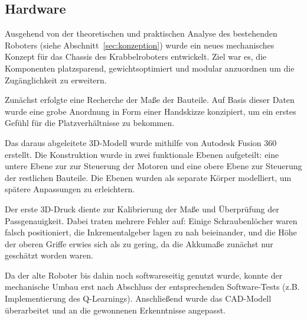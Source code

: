 \subsection{Hardware}

Ausgehend von der theoretischen und praktischen Analyse des bestehenden Roboters (siehe Abschnitt~\ref{sec:konzeption}) wurde ein neues mechanisches Konzept für das Chassis des Krabbelroboters 
entwickelt. Ziel war es, die Komponenten platzsparend, gewichtsoptimiert und modular anzuordnen um die Zugänglichkeit zu erweitern.

Zunächst erfolgte eine Recherche der Maße der Bauteile. Auf Basis dieser Daten wurde eine grobe Anordnung in Form einer Handskizze konzipiert, um ein erstes Gefühl für die Platzverhältnisse zu bekommen.

Das daraus abgeleitete 3D-Modell wurde mithilfe von Autodesk Fusion 360 erstellt. Die Konstruktion wurde in zwei funktionale Ebenen aufgeteilt: 
eine untere Ebene zur zur Steuerung der Motoren und eine obere Ebene zur Steuerung der restlichen Bauteile. 
Die Ebenen wurden als separate Körper modelliert, um spätere Anpassungen zu erleichtern.

Der erste 3D-Druck diente zur Kalibrierung der Maße und Überprüfung der Passgenauigkeit. Dabei traten mehrere Fehler auf: 
Einige Schraubenlöcher waren falsch positioniert, die Inkrementalgeber lagen zu nah beieinander, und die Höhe der oberen Griffe erwies sich als zu gering, 
da die Akkumaße zunächst nur geschätzt worden waren.

Da der alte Roboter bis dahin noch softwareseitig genutzt wurde, konnte der mechanische Umbau erst nach Abschluss der entsprechenden Software-Tests (z.B. Implementierung des Q-Learnings). 
Anschließend wurde das CAD-Modell überarbeitet und an die gewonnenen Erkenntnisse angepasst.

